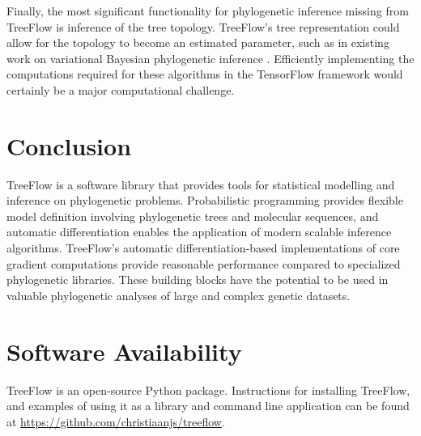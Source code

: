 Finally, the most significant functionality for phylogenetic inference missing from TreeFlow is inference of the tree topology. TreeFlow's tree representation could allow for the topology to become an estimated parameter, such as in existing work on variational Bayesian phylogenetic inference \cite{zhang2018variational}. Efficiently implementing the computations required for these algorithms in the TensorFlow framework would certainly be a major computational challenge.

\section{Conclusion}

TreeFlow is a software library that provides tools for statistical modelling and inference on phylogenetic problems. Probabilistic programming provides flexible model definition involving phylogenetic trees and molecular sequences, and automatic differentiation enables the application of modern scalable inference algorithms. TreeFlow's automatic differentiation-based implementations of core gradient computations provide reasonable performance compared to specialized phylogenetic libraries. These building blocks have the potential to be used in valuable phylogenetic analyses of large and complex genetic datasets.

\section{Software Availability}

TreeFlow is an open-source Python package. Instructions for installing TreeFlow, and examples of using it as a library and command line application can be found at \url{https://github.com/christiaanjs/treeflow}.

